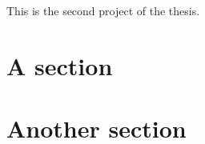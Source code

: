 This is the second project of the thesis.

\lipsum[1]

\section{A section}
\lipsum[2]

\section{Another section}
\lipsum[3]